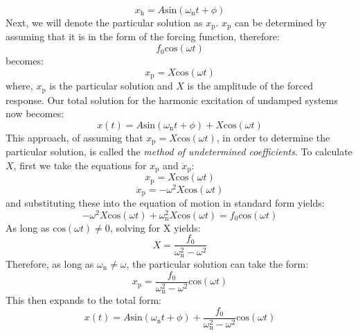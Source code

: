 \documentclass[12pt,letter]{article}
\begin{document}
 \begin{equation}
  x_\text{h} = A\text{sin}(\omega_\text{n} t + \phi)
 \end{equation}   
 Next, we will denote the particular solution as $x_\text{p}$. $x_\text{p}$ can be determined by assuming that it is in the form of the forcing function, therefore:
 \begin{equation}
  f_0\text{cos}(\omega t)
 \end{equation} 
 becomes:
 \begin{equation}
  x_\text{p}  =X\text{cos}(\omega t)
 \end{equation}      
 where, $x_\text{p}$ is the particular solution and $X$ is the amplitude of the forced response. Our total solution for the harmonic excitation of undamped systems now becomes:
 \begin{equation}
  x(t) = A\text{sin}(\omega_\text{n} t + \phi) + X\text{cos}(\omega t) 
 \end{equation}    
 This approach, of assuming that $x_\text{p}=X\text{cos}(\omega t)$, in order to determine the particular solution, is called the \emph{method of undetermined coefficients}. To calculate $X$, first we take the equations for $x_\text{p}$ and $\ddot{x}_\text{p} $:
 \begin{equation}
  x_\text{p} = X\text{cos}(\omega t)
 \end{equation} 
 \begin{equation}
  \ddot{x}_\text{p} = -\omega^2X\text{cos}(\omega t)
 \end{equation}    
 and substituting these into the equation of motion in standard form yields:
 \begin{equation}
  -\omega^2X\text{cos}(\omega t)+\omega_\text{n}^2X\text{cos}(\omega t) = f_0\text{cos}(\omega t)
 \end{equation}  
 As long as  $\text{cos}(\omega t) \neq  0$, solving for X yields:
 \begin{equation}
  X = \frac{f_0}{\omega_\text{n}^2-\omega^2}
  \label{eq:X}
 \end{equation}  
 Therefore, as long as $\omega_\text{n} \neq \omega$, the particular solution can take the form:
 \begin{equation}
  x_\text{p} = \frac{f_0}{\omega_\text{n}^2-\omega^2}\text{cos}(\omega t)
 \end{equation}      
 This then expands to the total form:
 \begin{equation}
  x(t) = A\text{sin}(\omega_\text{n} t + \phi) + \frac{f_0}{\omega_\text{n}^2-\omega^2}\text{cos}(\omega t)
 \end{equation}    
\end{document}
